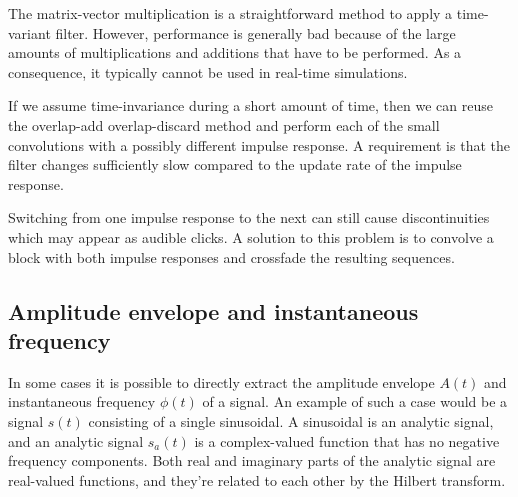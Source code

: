 The matrix-vector multiplication is a straightforward method to apply a
time-variant filter. However, performance is generally bad because of the large
amounts of multiplications and additions that have to be performed. As a consequence,
it typically cannot be used in real-time simulations.

If we assume time-invariance during a short amount of time, then we can reuse
the overlap-add overlap-discard method and perform each of the small convolutions with a
possibly different impulse response. A requirement is that the filter changes
sufficiently slow compared to the update rate of the impulse response.

Switching from one impulse response to the next can still cause discontinuities
which may appear as audible clicks. A solution to this problem is to convolve a block
with both impulse responses and crossfade the resulting sequences.




\subsection{Amplitude envelope and instantaneous frequency}\label{sec:theory:signal:hilbert}
In some cases it is possible to directly extract the amplitude envelope $A(t)$
and instantaneous frequency $\phi(t)$ of a signal. An example of such a case
would be a signal $s(t)$ consisting of a single sinusoidal. A sinusoidal is an
analytic signal, and an analytic signal $s_a(t)$ is a complex-valued function
that has no negative frequency components. Both real and imaginary parts of the
analytic signal are real-valued functions, and they're related to each other by
the Hilbert transform.

